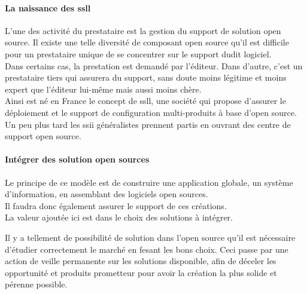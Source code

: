 				\paragraph{La naissance des \acrfull{ssll}\\}

				L'une des activité du prestataire est la gestion du support de solution open source. Il existe une telle diversité de composant open source qu'il est difficile pour un prestataire unique de se concentrer sur le support dudit logiciel.\\

				Dans certains cas, la prestation est demandé par l'éditeur. Dans d'autre, c'est un prestataire tiers qui assurera du support, sans doute moins légitime et moins expert que l'éditeur lui-même mais aussi moins chère.\\

				Ainsi est né en France le concept de \acrshort{ssll}, une société qui propose d'assurer le déploiement et le support de configuration multi-produits à base d'open source.\\

				Un peu plus tard les \acrfull{ssii} généralistes prennent partis en ouvrant des centre de support open source.

				\paragraph{Intégrer des solution open sources\\}

				Le principe de ce modèle est de construire une application globale, un système d'information, en assemblant des logiciels open sources.\\

				Il faudra donc également assurer le support de ces créations.\\
				La valeur ajoutée ici est dans le choix des solutions à intégrer. 

				Il y a tellement de possibilité de solution dans l'open source qu'il est nécessaire d'étudier correctement le marché en fesant les bons choix. Ceci passe par une action de veille permanente sur les solutions disponible, afin de déceler les opportunité et produits prometteur pour avoir la création la plus solide et pérenne possible.









